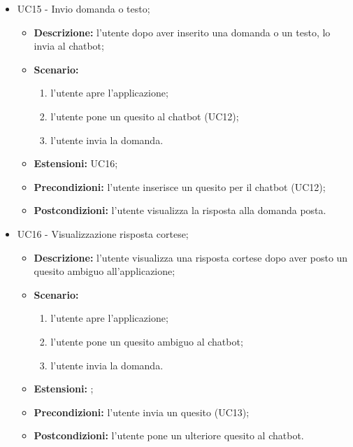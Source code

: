 \documentclass[10pt, a4paper]{article}
\begin{document}
\begin{itemize}
    \item UC15 - Invio domanda o testo;
    \begin{itemize}
        \item \textbf{Descrizione: }l'utente dopo aver inserito una domanda o un testo, lo invia al chatbot;
        \item \textbf{Scenario: }
        \begin{enumerate}[label={\arabic*.}, align=left]
        \item l'utente apre l'applicazione;
        \item l'utente pone un quesito al chatbot (UC12);
        \item l'utente invia la domanda.
        \end{enumerate}
        \item \textbf{Estensioni: }UC16;
        \item \textbf{Precondizioni:} l'utente inserisce un quesito per il chatbot (UC12);
        \item \textbf{Postcondizioni: }l'utente visualizza la risposta alla domanda posta.\\
    \end{itemize}
    
    \item UC16 - Visualizzazione risposta cortese;
    \begin{itemize}
        \item \textbf{Descrizione: }l'utente visualizza una risposta cortese dopo aver posto un quesito ambiguo all'applicazione;
        \item \textbf{Scenario: }
        \begin{enumerate}[label={\arabic*.}, align=left]
        \item l'utente apre l'applicazione;
        \item l'utente pone un quesito ambiguo al chatbot;
        \item l'utente invia la domanda.
        \end{enumerate}
        \item \textbf{Estensioni: };
        \item \textbf{Precondizioni:} l'utente invia un quesito (UC13);
        \item \textbf{Postcondizioni: }l'utente pone un ulteriore quesito al chatbot.\\
    \end{itemize}
    

\end{itemize}
\end{document}
